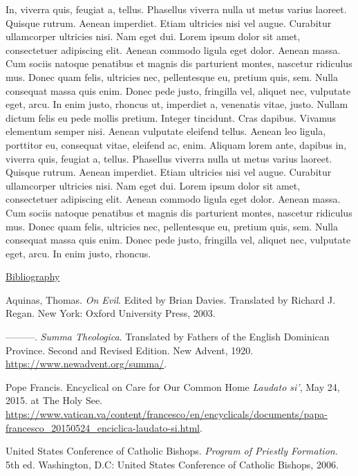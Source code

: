 \documentclass[
    12pt,
    letterpaper,
    oneside,
    noraggedright
]{turabian-researchpaper}
\newlength{\cslhangindent}
\newenvironment{CSLReferences}[2]
 {
\newpage %
\centerline{\underline{Bibliography}} %
 \setlength{\parindent}{0pt}
 \singlespacing
  \let\oldpar\par
  \def\par{\hangindent=\cslhangindent\oldpar}
  \setlength{\parskip}{1em}
 }
{
}
\begin{document}
In, viverra quis, feugiat a, tellus. Phasellus viverra nulla ut metus
varius laoreet. Quisque rutrum. Aenean imperdiet. Etiam ultricies nisi
vel augue. Curabitur ullamcorper ultricies nisi. Nam eget dui. Lorem
ipsum dolor sit amet, consectetuer adipiscing elit. Aenean commodo
ligula eget dolor. Aenean massa. Cum sociis natoque penatibus et magnis
dis parturient montes, nascetur ridiculus mus. Donec quam felis,
ultricies nec, pellentesque eu, pretium quis, sem. Nulla consequat massa
quis enim. Donec pede justo, fringilla vel, aliquet nec, vulputate eget,
arcu. In enim justo, rhoncus ut, imperdiet a, venenatis vitae, justo.
Nullam dictum felis eu pede mollis pretium. Integer tincidunt. Cras
dapibus. Vivamus elementum semper nisi. Aenean vulputate eleifend
tellus. Aenean leo ligula, porttitor eu, consequat vitae, eleifend ac,
enim. Aliquam lorem ante, dapibus in, viverra quis, feugiat a, tellus.
Phasellus viverra nulla ut metus varius laoreet. Quisque rutrum. Aenean
imperdiet. Etiam ultricies nisi vel augue. Curabitur ullamcorper
ultricies nisi. Nam eget dui. Lorem ipsum dolor sit amet, consectetuer
adipiscing elit. Aenean commodo ligula eget dolor. Aenean massa. Cum
sociis natoque penatibus et magnis dis parturient montes, nascetur
ridiculus mus. Donec quam felis, ultricies nec, pellentesque eu, pretium
quis, sem. Nulla consequat massa quis enim. Donec pede justo, fringilla
vel, aliquet nec, vulputate eget, arcu. In enim justo, rhoncus.

\hypertarget{refs}{}
\begin{CSLReferences}{1}{0}
\leavevmode{}%
Aquinas, Thomas. \emph{On Evil}. Edited by Brian Davies. Translated by
Richard J. Regan. New York: Oxford University Press, 2003.

\leavevmode{}%
---------. \emph{Summa Theologica}. Translated by Fathers of the English
Dominican Province. Second and Revised Edition. New Advent, 1920.
\url{https://www.newadvent.org/summa/}.

\leavevmode{}%
Pope Francis. {Encyclical on Care for Our Common Home \emph{Laudato
si'},} May 24, 2015. at The Holy See.
\url{https://www.vatican.va/content/francesco/en/encyclicals/documents/papa-francesco_20150524_enciclica-laudato-si.html}.

\leavevmode{}%
United States Conference of Catholic Bishops. \emph{Program of Priestly
Formation}. 5th ed. Washington, D.C: United States Conference of
Catholic Bishops, 2006.

\end{CSLReferences}
\end{document}
